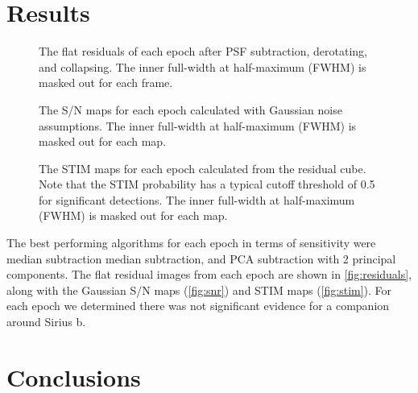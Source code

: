 \documentclass[twocolumn]{aastex631}
\begin{document}
\section{Results} \label{sec:results}

\begin{figure*}
    \centering
    \caption{The flat residuals of each epoch after PSF subtraction, derotating, and collapsing. The inner full-width at half-maximum (FWHM) is masked out for each frame.}
    \label{fig:residuals}
\end{figure*}

\begin{figure*}
    \centering
    \caption{The S/N maps for each epoch calculated with Gaussian noise assumptions. The inner full-width at half-maximum (FWHM) is masked out for each map.}
    \label{fig:snr}
\end{figure*}

\begin{figure*}
    \centering
    \caption{The STIM maps for each epoch calculated from the residual cube. Note that the STIM probability has a typical cutoff threshold of 0.5 for significant detections. The inner full-width at half-maximum (FWHM) is masked out for each map.}
    \label{fig:stim}
\end{figure*}


The best performing algorithms for each epoch in terms of sensitivity were median subtraction median subtraction, and PCA subtraction with 2 principal components. The flat residual images from each epoch are shown in \autoref{fig:residuals}, along with the Gaussian S/N maps (\autoref{fig:snr}) and STIM maps (\autoref{fig:stim}). For each epoch we determined there was not significant evidence for a companion around Sirius b.



\section{Conclusions} \label{sec:conclusion}


\begin{acknowledgments}

\end{acknowledgments}


{}

\end{document}
